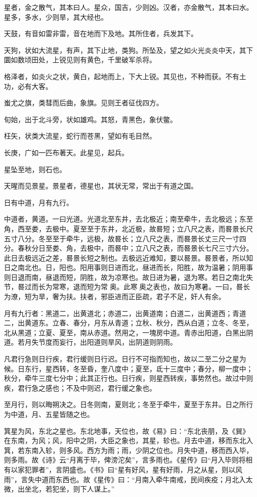 \documentclass[]{article}
\begin{document}
星者，金之散气，其本曰人。星众，国吉，少则凶。汉者，亦金散气，其本曰水。星多，多水，少则旱，其大经也。

天鼓，有音如雷非雷，音在地而下及地。其所住者，兵发其下。

天狗，状如大流星，有声，其下止地，类狗。所坠及，望之如火光炎炎中天，其下圜如数顷田处，上锐见则有黄色，千里破军杀将。

格泽者，如炎火之状，黄白，起地而上，下大上锐。其见也，不种而获。不有土功，必有大客。

蚩尤之旗，类彗而后曲，象旗。见则王者征伐四方。

旬始，出于北斗旁，状如雄鸡。其怒，青黑色，象伏鳖。

枉矢，状类大流星，蛇行而苍黑，望如有毛目然。

长庚，广如一匹布著天。此星见，起兵。

星坠至地，则石也。

天暒而见景星。景星者，德星也，其状无常，常出于有道之国。

日有中道，月有九行。

中道者，黄道。一曰光道。光道北至东井，去北极近；南至牵牛，去北极远；东至角，西至娄，去极中。夏至至于东井，北近极，故晷短；立八尺之表，而晷景长尺五寸八分。冬至至于牵牛，远极，故晷长；立八尺之表，而晷景长丈三尺一寸四分。春秋分日至娄、角，去极中，而晷中；立八尺之表，而晷景长七尺三寸六分。此日去极远近之差，晷景长短之制也。去极远近难知，要以晷景。晷景者，所以知日之南北也。日，阳也。阳用事则日进而北，昼进而长，阳胜，故为温暑；阴用事则日退而南，昼退而短，阴胜，故为凉寒也。故日进为暑，退为寒。若日之南北失节，晷过而长为常寒，退而短为常奥。此寒奥之表也，故曰为寒暑。一曰，晷长为潦，短为旱，奢为扶。扶者，邪臣进而正臣疏，君子不足，奸人有余。

月有九行者：黑道二，出黄道北；赤道二，出黄道南；白道二，出黄道西；青道二，出黄道东。立春、春分，月东从青道；立秋、秋分，西从白道；立冬、冬至，北从黑道；立夏、夏至，南从赤道。然用之，一塊房中道。青赤出阳道，白黑出阴道。若月失节度而妄行，出阳道则旱风，出阴道则阴雨。

凡君行急则日行疾，君行缓则日行迟。日行不可指而知也，故以二至二分之星为候。日东行，星西转，冬至昏，奎八度中；夏至，氐十三度中；春分，柳一度中；秋分，牵牛三度七分中；此其正行也。日行疾，则星西转疾，事势然也。故过中则疾，君行急之感也；不及中则迟，君行缓之象也。

至月行，则以晦朔决之。日冬则南，夏则北；冬至于牵牛，夏至于东井。日之所行为中道，月、五星皆随之也。

箕星为风，东北之星也。东北地事，天位也，故《易》曰：``东北丧朋，及《巽》在东南，为风；风，阳中之阴，大臣之象也，其星，轸也。月去中道，移而东北入箕，若东南入轸，则多风。西方为雨；雨，少阴之位也。月失中道，移而西入毕，则多雨。故《诗》云``月离于毕，俾滂沱矣''，言多雨也。《星传》曰``月入毕则将相有以家犯罪者''，言阴盛也。《书》曰``星有好风，星有好雨，月之从星，则以风雨''，言失中道而东西也。故《星传》曰：``月南入牵牛南戒，民间疾疫；月北入太微，出坐北，若犯坐，则下人谋上。''
\end{document}
